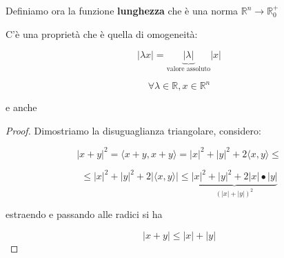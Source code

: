 \documentclass[../appunti-analisi.tex]{subfiles}
\begin{document}
 Definiamo ora la funzione \textbf{lunghezza} che è una norma $\mathbb{R}^{n}\rightarrow \mathbb{R}_0^{+}$

 C'è una proprietà che è quella di omogeneità:

 \[
     |\lambda x| = \underbrace{|\lambda|}_\text{valore assoluto} |x| 
 \]

 \[
 \forall \lambda \in \mathbb{R},x \in \mathbb{R}^{n}    
 \]

 e anche 


 

\begin{proof}
       Dimostriamo la disuguaglianza triangolare, considero:

       \[
           |x+y|^{2} = \langle x+y , x+y \rangle = |x|^{2}+|y|^{2} + 2 \langle x,y \rangle \le 
       \]

       \[
           \le |x|^{2} + |y| ^{2} + 2|\langle x,y \rangle| \le \underbrace{|x| ^{2} + |y|^{2} + 2|x|\bullet |y|}_{(|x|+|y|)^{2}}
       \]

       estraendo e passando alle radici si ha

       \[
           |x+y| \le |x|+|y|
       \]
\end{proof}



\end{document}
